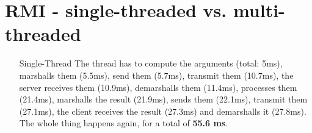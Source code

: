 \documentclass{tudexercise}
\begin{document}
	\section{RMI - single-threaded vs. multi-threaded}
		\begin{itemize}
			\item[Single-Thread] The thread has to compute the arguments (total: 5ms), marshalls them (5.5ms), send them (5.7ms), transmit them (10.7ms), the server receives them (10.9ms), demarshalls them (11.4ms), processes them (21.4ms), marshalls the result (21.9ms), sends them (22.1ms), transmit them (27.1ms), the client receives the result (27.3ms) and demarshalls it (27.8ms). The whole thing happens again, for a total of \textbf{55.6 ms}.
		\end{itemize}
\end{document}
